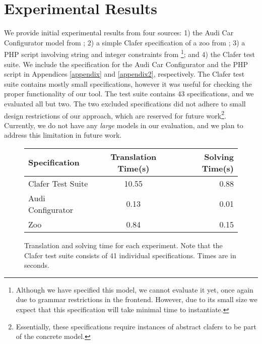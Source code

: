 \documentclass{easychair}
\begin{document}
\section{Experimental Results}
We provide initial experimental results from four sources: 1) the Audi Car Configurator model from \cite{Michel2012}; 2) a simple Clafer specification of a zoo from \cite{Liang}; 3) a PHP script involving string and integer constraints from \cite{Zheng2013}\footnote{Although we have specified this model, we cannot evaluate it yet, once again due to grammar restrictions in the frontend. However, due to its small size we expect that this specification will take minimal time to instantiate.}; and 4) the Clafer test suite. We include the specification for the Audi Car Configurator and the PHP script in Appendices \ref{appendix} and \ref{appendix2}, respectively. The Clafer test suite contains mostly small specifications, however it was useful for checking the proper functionality of our tool. The test suite contains 43 specifications, and we evaluated all but two. The two excluded specifications did not adhere to small design restrictions of our approach, which are reserved for future work\footnote{Essentially, these specifications require instances of abstract clafers to be part of the concrete model.}. Currently, we do not have any \textit{large} models in our evaluation, and we plan to address this limitation in future work. \\ %
\begin{figure}
\begin{center}
  \begin{tabular}{ l || c | r }
    \hline
    Specification & Translation Time(s) & Solving Time(s) \\ \hline \hline
    Clafer Test Suite & 10.55 & 0.88 \\ \hline
    Audi Configurator & 0.13 & 0.01 \\ \hline
    Zoo & 0.84 & 0.15 \\
    \hline
  \end{tabular}
\end{center}
\label{resultstable}
\caption{Translation and solving time for each experiment. Note that the Clafer test suite consists of 41 individual specifications. Times are in seconds.}
\end{figure}
\end{document}
